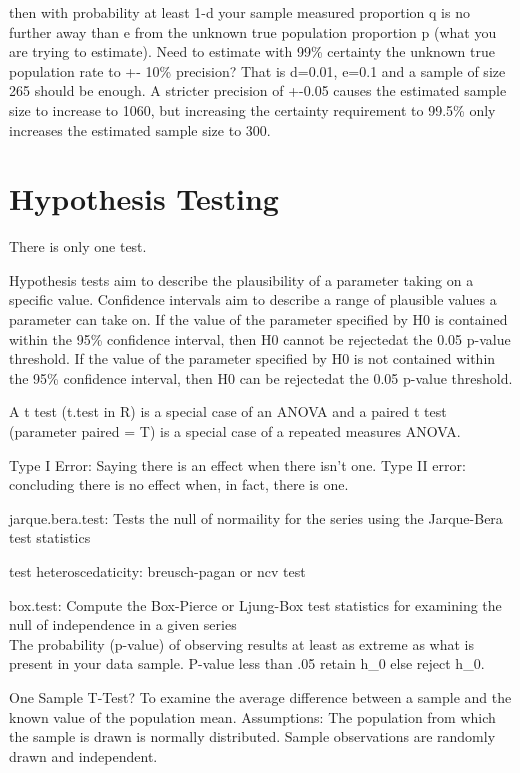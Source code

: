 \documentclass[]{book}
\begin{document}
then with probability at least 1-d your sample measured proportion q is no further away than e from the unknown true population proportion p (what you are trying to estimate). Need to estimate with 99\% certainty the unknown true population rate to +- 10\% precision? That is d=0.01, e=0.1 and a sample of size 265 should be enough. A stricter precision of +-0.05 causes the estimated sample size to increase to 1060, but increasing the certainty requirement to 99.5\% only increases the estimated sample size to 300.

\hypertarget{hypothesis-testing}{%
\section{Hypothesis Testing}\label{hypothesis-testing}}

There is only one test.

Hypothesis tests aim to describe the plausibility of a parameter taking on a specific value. Confidence intervals aim to describe a range of plausible values a parameter can take on. If the value of the parameter specified by H0 is contained within the 95\% confidence interval, then H0 cannot be rejectedat the 0.05 p-value threshold. If the value of the parameter specified by H0 is not contained within the 95\% confidence interval, then H0 can be rejectedat the 0.05 p-value threshold.

A t test (t.test in R) is a special case of an ANOVA and a paired t test (parameter paired = T) is a special case of a repeated measures ANOVA.

Type I Error: Saying there is an effect when there isn't one. Type II error: concluding there is no effect when, in fact, there is one.

jarque.bera.test: Tests the null of normaility for the series using the Jarque-Bera test statistics

test heteroscedaticity: breusch-pagan or ncv test

box.test: Compute the Box-Pierce or Ljung-Box test statistics for examining the null of independence in a given series\\
The probability (p-value) of observing results at least as extreme as what is present in your data sample. P-value less than .05 retain h\_0 else reject h\_0.

One Sample T-Test? To examine the average difference between a sample and the known value of the population mean. Assumptions: The population from which the sample is drawn is normally distributed. Sample observations are randomly drawn and independent.
\end{document}
